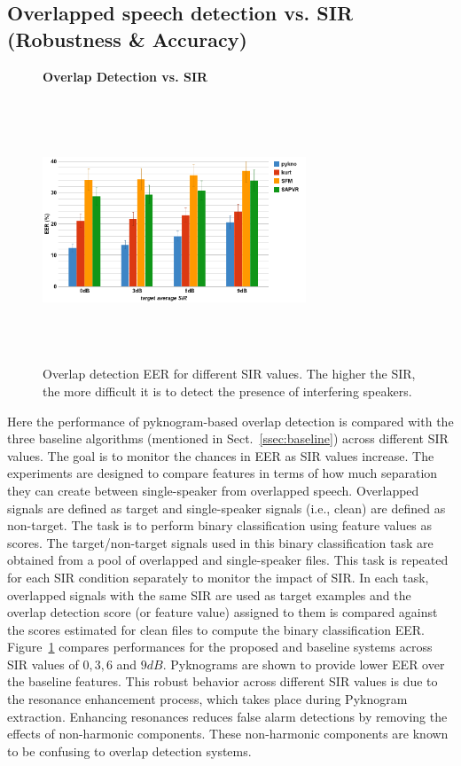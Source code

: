 {\subsection{Overlapped speech detection vs. SIR (Robustness \& Accuracy)}
\label{sssec:ovl_frame_vs_sir}
\begin{figure}[b!]
	\centering
	\hspace{-1mm}
	\textbf{Overlap Detection vs. SIR}\par\medskip
	\includegraphics[height = 3.1in, width=0.7\textwidth]{figures/ovldet_vs_sir}
	\vspace{-1mm}
	\caption{ Overlap detection EER for different SIR values. The higher the SIR, the more difficult it is to detect the presence of interfering speakers.}
	\vspace{0mm}
	\label{fig:ch2_ovl_det}
\end{figure}
Here the performance of pyknogram-based overlap detection is compared with the three baseline algorithms (mentioned in Sect.~\ref{ssec:baseline}) across different SIR values. 
The goal is to monitor the chances in EER as SIR values increase. 
The experiments are designed to compare features in terms of how much separation they can create between single-speaker from overlapped speech. 
Overlapped signals are defined as target and single-speaker signals (i.e., clean) are defined as non-target. 
The task is to perform binary classification using feature values as scores. 
The target/non-target signals used in this binary classification task are obtained from a pool of overlapped and single-speaker files. 
This task is repeated for each SIR condition separately to monitor the impact of SIR. 
In each task, overlapped signals with the same SIR are used as target examples and the overlap detection score (or feature value) assigned to them is compared against the scores estimated for clean files to compute the binary classification EER. 
Figure~\ref{fig:ch2_ovl_det} compares performances for the proposed and baseline systems across SIR values of $0, 3, 6$ and $9dB$. 
Pyknograms are shown to provide lower EER over the baseline features. 
This robust behavior across different SIR values is due to the resonance enhancement process, which takes place during Pyknogram extraction. 
Enhancing resonances reduces false alarm detections by removing the effects of non-harmonic components. 
These non-harmonic components are known to be confusing to overlap detection systems. 


}
